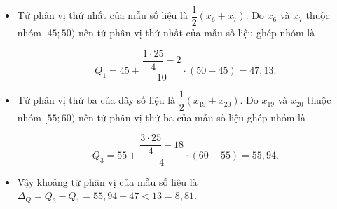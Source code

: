\begin{bt}
{\begin{itemize}
			$$
			Q_2=50+\dfrac{\dfrac{25}{2}-12}{6} \cdot(55-50)=50{,}42.
			$$
		\item	Tứ phân vị thứ nhất của mẫu số liệu là $\dfrac{1}{2}\left(x_6+x_7\right)$.
		Do $x_6$ và $x_7$ thuộc nhóm $[45; 50)$ nên tứ phân vị thứ nhất của mẫu số liệu ghép nhóm là
		
		$$
		Q_1=45+\dfrac{\dfrac{1\cdot 25}{4}-2}{10} \cdot(50-45)=47{,}13.
		$$
		
	\item	Tứ phân vị thứ ba của dãy số liệu là $\dfrac{1}{2}\left(x_{19}+x_{20}\right)$. Do $x_{19}$ và $x_{20}$ thuộc nhóm $[55; 60)$ nên tứ phân vị thứ ba của mẫu số liệu ghép nhóm là
		
		$$
		Q_3=55+\dfrac{\dfrac{3\cdot 25}{4}-18}{4} \cdot(60-55)=55{,}94.
		$$
		\item
		Vậy khoảng tứ phân vị của mẫu số liệu là $\Delta_Q=Q_3-Q_1=55{,}94-47{<}13=8{,}81.$	 
		\end{itemize}
}
\end{bt}

